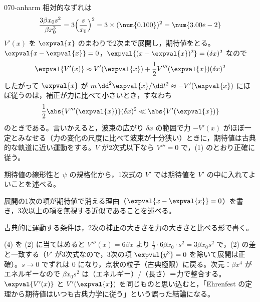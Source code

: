 \documentclass[uplatex,dvipdfmx,a4paper,11pt]{jsarticle}
\begin{document}
\begin{kaisetsu}{070-anharm}
 相対的なずれは
\[ \frac{3\beta x_{0}s^{2}}{\beta x_{0}^{3}}=3\Bigl(\frac{s}{x_{0}}\Bigr)^{2}=3\times(\num{0.100})^{2}=\num{3.00e-2} \]
 $V'(x)$ を $\expval{x}$ のまわりで2次まで展開し，期待値をとる。$\expval{x-\expval{x}}=0$，$\expval{(x-\expval{x})^{2}}=(\delta x)^{2}$ なので
\[ \expval{V'(x)}\approx V'(\expval{x})+\frac{1}{2}V'''(\expval{x})(\delta x)^{2} \]
したがって $\expval{x}$ が $m\,\dd^{2}\expval{x}/\dd t^{2}\approx-V'(\expval{x})$ にほぼ従うのは，補正が力に比べて小さいとき，すなわち
\[ \frac{1}{2}\abs{V'''(\expval{x})}(\delta x)^{2}\ll\abs{V'(\expval{x})} \]
のときである。言いかえると，波束の広がり $\delta x$ の範囲で力 $-V'(x)$ がほぼ一定とみなせる（力の変化の尺度に比べて波束が十分狭い）ときに，期待値は古典的な軌道に近い運動をする。$V$ が2次式以下なら $V'''=0$ で，(1) のとおり正確に従う。
\begin{ronten}
  \item {} 期待値の線形性と $\psi$ の規格化から，1次式の $V'$ では期待値を $V'$ の中に入れてよいことを述べる。
  \item {} 展開の1次の項が期待値で消える理由（$\expval{x-\expval{x}}=0$）を書き，3次以上の項を無視する近似であることを述べる。
  \item {} 古典的に運動する条件は，2次の補正の大きさを力の大きさと比べる形で書く。
\end{ronten}
\kenzan (4) を (2) に当てはめると $V'''(x)=6\beta x$ より $\frac{1}{2}\cdot6\beta x_{0}\cdot s^{2}=3\beta x_{0}s^{2}$ で，(2) の差と一致する（$V'$ が3次式なので，3次の項 $\expval{y^{3}}=0$ を除いて展開は正確）。$s\to0$ でずれは $0$ になり，点状の粒子（古典極限）に戻る。次元：$\beta x^{4}$ がエネルギーなので $\beta x_{0}s^{2}$ は（エネルギー）/（長さ）＝力で整合する。
\tsumazuki $\expval{V'(x)}$ と $V'(\expval{x})$ を同じものと思い込むと，「Ehrenfest の定理から期待値はいつも古典力学に従う」という誤った結論になる。
\end{kaisetsu}
\end{document}
